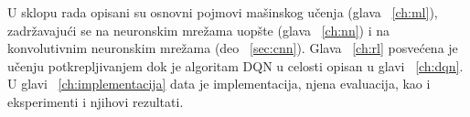 \par 
U sklopu rada opisani su osnovni pojmovi mašinskog učenja (glava ~\ref{ch:ml}), zadržavajući se na neuronskim mrežama uopšte (glava ~\ref{ch:nn}) i na konvolutivnim neuronskim mrežama (deo ~\ref{sec:cnn}). Glava ~\ref{ch:rl} posvećena je učenju potkrepljivanjem dok je algoritam DQN u celosti opisan u glavi ~\ref{ch:dqn}. U glavi ~\ref{ch:implementacija} data je implementacija, njena evaluacija, kao i eksperimenti i njihovi rezultati.